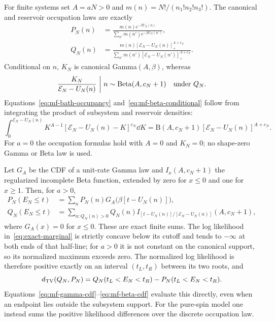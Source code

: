 For finite systems set $A=aN>0$ and $m(n)=N!/(n_1!n_2!n_3!)$. The
canonical and reservoir occupation laws are exactly
\begin{align}
 P_N(n)&=\frac{m(n)e^{-\beta U_N(n)}}
                  {\sum_{n'}m(n')e^{-\beta U_N(n')}},
 \label{eq:mf-canonical-occupancy}\\
 Q_N(n)&=\frac{m(n)[\mathcal E_N-U_N(n)]_+^{A+c_N}}
                  {\sum_{n'}m(n')[\mathcal E_N-U_N(n')]_+^{A+c_N}}.
 \label{eq:mf-bath-occupancy}
\end{align}
Conditional on $n$, $K_N$ is canonical Gamma$(A,\beta)$, whereas
\begin{equation}
 \frac{K_N}{\mathcal E_N-U_N(n)}\ \bigg|\ n
 \sim\operatorname{Beta}(A,c_N+1)
 \quad\hbox{under }Q_N.
 \label{eq:mf-beta-conditional}
\end{equation}
Equations~\eqref{eq:mf-bath-occupancy}
and~\eqref{eq:mf-beta-conditional} follow from integrating the product
of subsystem and reservoir densities:
\[
 \int_0^{\mathcal E_N-U_N(n)}
 K^{A-1}[\mathcal E_N-U_N(n)-K]^{c_N}\dd K
 =\mathrm B(A,c_N+1)[\mathcal E_N-U_N(n)]^{A+c_N}.
\]
For $a=0$ the occupation formulas hold with $A=0$ and $K_N=0$; no
shape-zero Gamma or Beta law is used.

Let $G_A$ be the CDF of a unit-rate Gamma law and $I_x(A,c_N+1)$ the
regularized incomplete Beta function, extended by zero for $x\le0$
and one for $x\ge1$. Then, for $a>0$,
\begin{align}
 P_N(E_N\le t)&=\sum_nP_N(n)G_A\bigl(\beta[t-U_N(n)]\bigr),
 \label{eq:mf-gamma-cdf}\\
 Q_N(E_N\le t)&=\sum_{n:Q_N(n)>0}Q_N(n)
 I_{[t-U_N(n)]/[\mathcal E_N-U_N(n)]}(A,c_N+1),
 \label{eq:mf-beta-cdf}
\end{align}
where $G_A(x)=0$ for $x\le0$. These are exact finite sums. The log
likelihood in~\eqref{eq:exact-marginal} is
strictly concave below its cutoff and tends to $-\infty$ at both ends
of that half-line; for $a>0$ it is not constant on the canonical
support, so its normalized maximum exceeds zero. The normalized log
likelihood is therefore positive exactly on an interval $(t_L,t_R)$
between its two roots, and
\begin{equation}
 d_{\mathrm{TV}}(Q_N,P_N)=Q_N(t_L<E_N<t_R)-P_N(t_L<E_N<t_R).
 \label{eq:mf-tv-cdf}
\end{equation}
Equations~\eqref{eq:mf-gamma-cdf}--\eqref{eq:mf-beta-cdf} evaluate
this directly, even when an endpoint lies outside the subsystem
support. For the pure-spin model one instead sums
the positive likelihood differences over the discrete occupation law.

